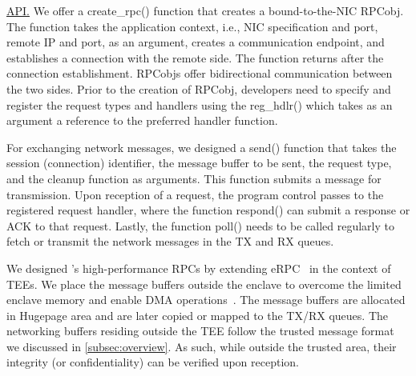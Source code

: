 \noindent\underline{API.} We offer a create\_rpc() function that creates a bound-to-the-NIC RPCobj. The function takes the application context, i.e., NIC specification and port, remote IP and port, as an argument, creates a communication endpoint, and establishes a connection with the remote side. The function returns after the connection establishment. RPCobjs offer bidirectional communication between the two sides. Prior to the creation of RPCobj, developers need to specify and register the request types and handlers using the reg\_hdlr() which takes as an argument a reference to the preferred handler function. %

For exchanging network messages, we designed a send() function that takes the session (connection) identifier, the message buffer to be sent, the request type, and the cleanup function as arguments. This function submits a message for transmission. Upon reception of a request, the program control passes to the registered request handler, where the function respond() can submit a response or ACK to that request. Lastly, the function poll() needs to be called regularly to fetch or transmit the network messages in the TX and RX queues.





\begin{comment}
~\footnote{DMA mappings are prohibited in the trusted area of a TEE as this violates TEE's security properties~\cite{intel-sgx, avocado, treaty}}
\end{comment}

We designed \projecttitle{}'s high-performance RPCs by extending eRPC~\cite{erpc} in the context of TEEs. We place the message buffers outside the enclave to overcome the limited enclave memory and enable DMA operations~\cite{intel-sgx, avocado, treaty}. The message buffers are allocated in Hugepage area and are later copied or mapped to the TX/RX queues. The networking buffers residing outside the TEE follow the trusted message format we discussed in \ref{subsec:overview}. As such, while outside the trusted area, their integrity (or confidentiality) can be verified upon reception.

